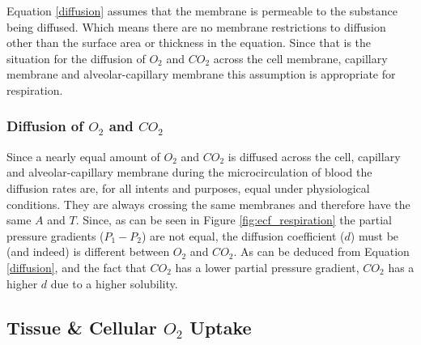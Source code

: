 Equation \ref{diffusion} assumes that the membrane is permeable to the substance being diffused. Which means there are no membrane restrictions to diffusion other than the surface area or thickness in the equation. Since that is the situation for the diffusion of $O_2$ and $CO_2$ across the cell membrane, capillary membrane and alveolar-capillary membrane this assumption is appropriate for respiration.\footnotemark{}

\subsubsection{Diffusion of $O_2$ and $CO_2$}

Since a nearly equal amount of $O_2$ and $CO_2$ is diffused across the cell, capillary and alveolar-capillary membrane during the microcirculation of blood the diffusion rates are, for all intents and purposes, equal under physiological conditions. They are always crossing the same membranes and therefore have the same $A$ and $T$. Since, as can be seen in Figure \ref{fig:ecf_respiration} the partial pressure gradients ($P_1 - P_2$) are not equal, the diffusion coefficient ($d$) must be (and indeed) is different between $O_2$ and $CO_2$. As can be deduced from Equation \ref{diffusion}, and the fact that $CO_2$ has a lower partial pressure gradient, $CO_2$ has a higher $d$ due to a higher solubility.\footnotemark{}

\subsection{Tissue \& Cellular $O_2$ Uptake}

